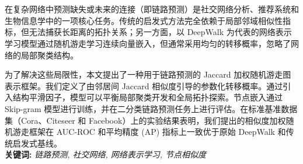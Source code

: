 
\chapter*{\huge {}}

在复杂网络中预测缺失或未来的连接（即链路预测）是社交网络分析、推荐系统和生物信息学中的一项核心任务。传统的启发式方法完全依赖于局部邻域相似性指标，但无法捕获长距离的拓扑关系；另一方面，以 DeepWalk 为代表的网络表示学习模型通过随机游走学习连续向量嵌入，但通常采用均匀的转移概率，忽略了网络的局部聚类结构。

为了解决这些局限性，本文提出了一种用于链路预测的 Jaccard 加权随机游走图表示框架。我们定义了由邻居间 Jaccard 相似度引导的参数化转移概率。通过引入结构平滑因子，模型可以平衡局部聚类开发和全局拓扑探索。节点嵌入通过 Skip-gram 模型进行训练，并在二分类链路预测任务上进行评估。在标准基准数据集（Cora、Citeseer 和 Facebook）上的实验结果表明，我们提出的相似度加权随机游走框架在 AUC-ROC 和平均精度 (AP) 指标上一致优于原始 DeepWalk 和传统启发式基线。\newline
\\
\textbf{关键词: } \textit{链路预测, 社交网络, 网络表示学习, 节点相似度}

